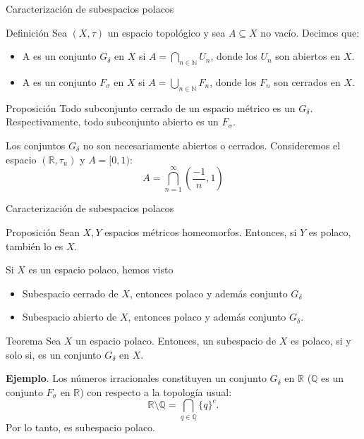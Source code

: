 \documentclass[8pt]{beamer}
\begin{document}
\begin{frame}{Caracterización de subespacios polacos}
    \begin{block}{Definición}
         Sea $(X,\tau)$ un espacio topológico y sea $A\subseteq X$ no vacío. Decimos que: 
    \begin{itemize}
        \item A es un conjunto $G_\delta$ en $X$ si $\displaystyle A = \bigcap_{n \in \mathbb{N}} U_n$, donde los $U_n$ son abiertos en $X$.
        \item A es un conjunto $F_\sigma$ en $X$ si $\displaystyle A= \bigcup_{n \in \mathbb{N}} F_n$, donde los $F_n$ son cerrados en $X$. 
    \end{itemize}
    \end{block}
    \pause   
    \begin{block}{Proposición}
        Todo subconjunto cerrado de un espacio métrico es un $G_\delta$. Respectivamente, todo subconjunto abierto es un $F_\sigma$. 
    \end{block}
    \pause
      Los conjuntos $G_\delta$ no son necesariamente abiertos o cerrados. Consideremos el espacio $(\mathbb R, \tau_u)$ y $A = [0,1)$:
    \[
    A=\bigcap_{n=1}^{\infty} \left( \frac{-1}{n}, 1\right)
    \]
\end{frame}

\begin{frame}{Caracterización de subespacios polacos}
\pause
    \begin{block}{Proposición}
        Sean $X,Y$ espacios métricos homeomorfos. Entonces, si $Y$ es polaco, también lo es $X$. 
    \end{block}
    \pause
    \vspace{0.2cm}
    Si $X$ es un espacio polaco, hemos visto
    \begin{itemize}
        \item Subespacio cerrado de $X$, entonces polaco y además conjunto $G_\delta$
        \item Subespacio abierto de $X$, entonces polaco y además conjunto $G_\delta$.
    \end{itemize}
    \pause
    \begin{block}{Teorema}
    Sea $X$ un espacio polaco. Entonces, un subespacio de $X$ es polaco, si y solo si, es un conjunto $G_\delta$ en $X$.
  \end{block}
  \pause
  \vspace{0.35cm}
     \textbf{Ejemplo}. Los números irracionales constituyen un conjunto $G_\delta$ en $\mathbb R$ ($\mathbb{Q}$ es un conjunto $F_\sigma$ en $\mathbb{R}$) con respecto a la topología usual:
    \[\mathbb{R}\setminus\mathbb{Q}=\bigcap_{q \in \mathbb{Q}} \{q\}^c.
    \]
Por lo tanto, es subespacio polaco.
\end{frame}
\end{document}
